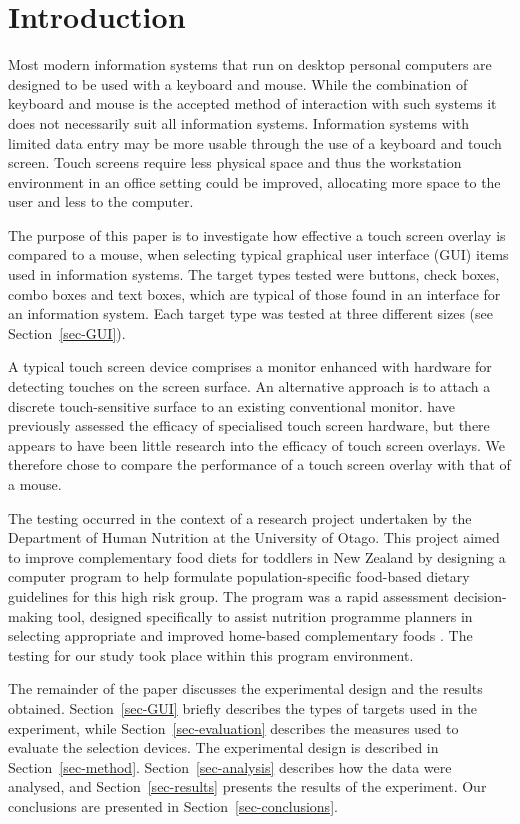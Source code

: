 \documentclass{elsart}
\begin{document}
\section{Introduction}
\label{sec-introduction}

Most modern information systems that run on desktop personal computers
are designed to be used with a keyboard and mouse. While the combination
of keyboard and mouse is the accepted method of interaction with such
systems it does not necessarily suit all information systems.
Information systems with limited data entry may be more usable through
the use of a keyboard and touch screen. Touch screens require less
physical space and thus the workstation environment in an office setting
could be improved, allocating more space to the user and less to the
computer.

The purpose of this paper is to investigate how effective a touch screen
overlay is compared to a mouse, when selecting typical graphical user
interface (GUI) items used in information systems. The target types
tested were buttons, check boxes, combo boxes and text boxes, which are
typical of those found in an interface for an information system. Each
target type was tested at three different sizes (see
Section~\ref{sec-GUI}).

A typical touch screen device comprises a monitor enhanced with hardware
for detecting touches on the screen surface. An alternative approach is
to attach a discrete touch-sensitive surface to an existing conventional
monitor. \citet{Sear-A-1991-IJMMS} have previously assessed the efficacy
of specialised touch screen hardware, but there appears to have been
little research into the efficacy of touch screen overlays. We therefore
chose to compare the performance of a touch screen overlay with that of
a mouse.

The testing occurred in the context of a research project undertaken by
the Department of Human Nutrition at the University of Otago. This
project aimed to improve complementary food diets for toddlers in New
Zealand by designing a computer program to help formulate
population-specific food-based dietary guidelines for this high risk
group. The program was a rapid assessment decision-making tool, designed
specifically to assist nutrition programme planners in selecting
appropriate and improved home-based complementary foods
\citep{Ferg-E-2004}. The testing for our study took place within this
program environment.

The remainder of the paper discusses the experimental design and the
results obtained. Section~\ref{sec-GUI} briefly describes the types of
targets used in the experiment, while Section~\ref{sec-evaluation}
describes the measures used to evaluate the selection devices. The
experimental design is described in Section~\ref{sec-method}.
Section~\ref{sec-analysis} describes how the data were analysed, and
Section~\ref{sec-results} presents the results of the experiment. Our
conclusions are presented in Section~\ref{sec-conclusions}.
\end{document}
